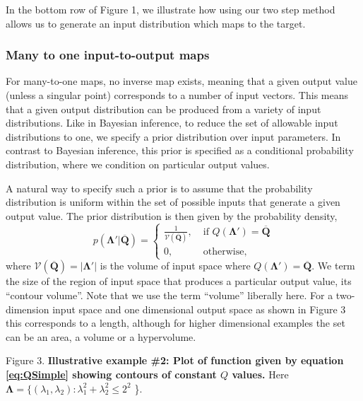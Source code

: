 \documentclass[10pt,letterpaper]{article}
\begin{document}
In the bottom row of Figure 1, we illustrate how using our two step method allows us to generate an input distribution which maps to the target.


\subsubsection{Many to one input-to-output maps}
\label{sec:many-2-one}
For many-to-one maps, no inverse map exists, meaning that a given output value (unless a singular point) corresponds to a number of input vectors. This means that a given output distribution can be produced from a variety of input distributions. Like in Bayesian inference, to reduce the set of allowable input distributions to one, we specify a prior distribution over input parameters. In contrast to Bayesian inference, this prior is specified as a conditional probability distribution, where we condition on particular output values.

A natural way to specify such a prior is to assume that the probability distribution is uniform within the set of possible inputs that generate a given output value. The prior distribution is then given by the probability density,
%
\begin{equation}\label{eq:priorDef}
p(\boldsymbol{\Lambda}'|\overline{\boldsymbol{Q}})=
\begin{cases}
\frac{1}{\mathcal{V}(\overline{\boldsymbol{Q}})}, \; & \text{if } Q(\boldsymbol{\Lambda}')=\overline{\boldsymbol{Q}} \\
0,                                                & \text{otherwise},
\end{cases}
\end{equation}
%
where $\mathcal{V}(\overline{\boldsymbol{Q}}) = |\boldsymbol{\Lambda}'|$ is the volume of input space where $Q(\boldsymbol{\Lambda}')=\overline{\boldsymbol{Q}}$. We term the size of the region of input space that produces a particular output value, its ``contour volume''. Note that we use the term ``volume'' liberally here. For a two-dimension input space and one dimensional output space as shown in Figure 3 this corresponds to a length, although for higher dimensional examples the set can be an area, a volume or a hypervolume.

\vspace{0.5cm}

Figure 3. \textbf{Illustrative example \#2: Plot of function given by equation \eqref{eq:QSimple} showing contours of constant $Q$ values.}
Here $\boldsymbol{\Lambda} = \{ (\lambda_1,\lambda_2): \lambda_1^2+\lambda_2^2\leq2^2$ \}.
\end{document}

